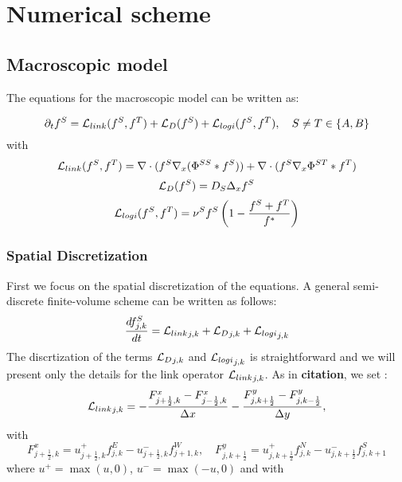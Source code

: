 	\section{Numerical scheme}
	\subsection{Macroscopic model}
	
The equations for the macroscopic model can be written as:

\begin{equation}
 {\partial}_t f^{S}={\mathcal{L}_{link}}(f^S,f^T)+{\mathcal{L}_{D}}(f^S)+{\mathcal{L}_{logi}}(f^S,f^T), \quad S\neq T\in\{A,B\}
\end{equation}
with
\begin{equation}
{\mathcal{L}_{link}}(f^S,f^T)=  \nabla \cdot (f^S\nabla_x(\Phi^{SS}* f^S)) + \nabla \cdot (f^S \nabla_x \Phi^{ST}*f^T)
\end{equation}
\begin{equation}
{\mathcal{L}_{D}}(f^S)= D_S \Delta_x f^S
\end{equation}
\begin{equation}
{\mathcal{L}_{logi}}(f^S,f^T)=\nu^{S}f^S\left( 1-\frac{f^S+f^T}{f^{*}} \right)
\end{equation}


\subsubsection{Spatial Discretization}


First we focus on the spatial discretization of the equations. A general semi-discrete finite-volume scheme can be written as follows:
\begin{equation}
\frac{d f^{S}_{j,k}}{dt}={\mathcal{L}_{link}}_{j,k}+{\mathcal{L}_{D}}_{j,k}+{\mathcal{L}_{logi}}_{j,k}
\end{equation}
The discrtization of the terms ${\mathcal{L}_{D}}_{j,k}$ and ${\mathcal{L}_{logi}}_{j,k}$ is straightforward and we will present only the details for the link operator ${\mathcal{L}_{link}}_{j,k}$. As in \textbf{citation}, we set :
\begin{equation}
{\mathcal{L}_{link}}_{j,k}= -\frac{F^{x}_{j+\frac{1}{2},k}-F^{x}_{j-\frac{1}{2},k}}{\Delta x}-\frac{F^{y}_{j,k+\frac{1}{2}}-F^{y}_{j,k-\frac{1}{2}}}{\Delta y},
\end{equation}
with
\begin{equation*}
 F^{x}_{j+\frac{1}{2},k}=u^{+}_{j+\frac{1}{2},k}f^{E}_{j,k}-
u^{-}_{j+\frac{1}{2},k}f^{W}_{j+1,k}, \quad F^{y}_{j,k+\frac{1}{2}}=u^{+}_{j,k+\frac{1}{2}}f^{N}_{j,k}-
u^{-}_{j,k+\frac{1}{2}}f^{S}_{j,k+1}
\end{equation*}
where $u^{+}=\max(u,0)$, $u^{-}=\max(-u,0)$ and with 

